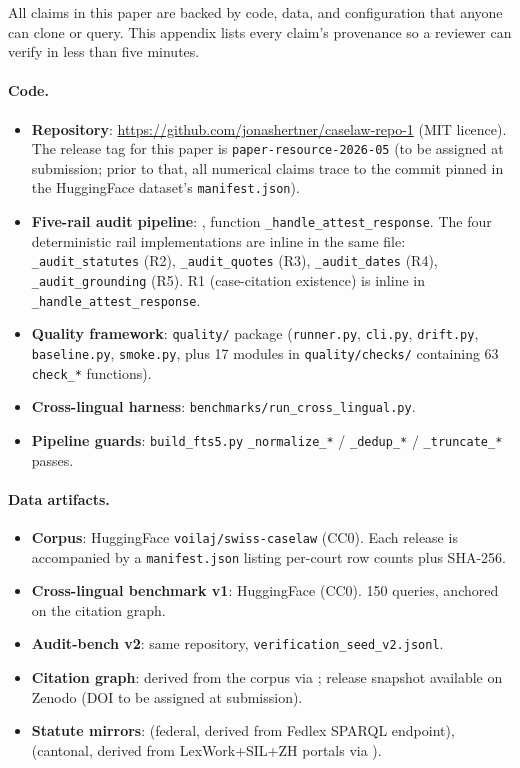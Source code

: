 All claims in this paper are backed by code, data, and configuration
that anyone can clone or query. This appendix lists every claim's
provenance so a reviewer can verify in less than five minutes.

\paragraph{Code.}
\begin{itemize}
\item \textbf{Repository}: \url{https://github.com/jonashertner/caselaw-repo-1}
  (MIT licence). The release tag for this paper is
  \texttt{paper-resource-2026-05} (to be assigned at submission;
  prior to that, all numerical claims trace to the commit pinned in
  the HuggingFace dataset's \texttt{manifest.json}).
\item \textbf{Five-rail audit pipeline}:
  , function \texttt{\_handle\_attest\_response}.
  The four
  deterministic rail implementations are inline in the same file:
  \texttt{\_audit\_statutes} (R2),
  \texttt{\_audit\_quotes} (R3),
  \texttt{\_audit\_dates} (R4),
  \texttt{\_audit\_grounding} (R5). R1 (case-citation existence) is
  inline in \texttt{\_handle\_attest\_response}.
\item \textbf{Quality framework}: \texttt{quality/} package
  (\texttt{runner.py}, \texttt{cli.py}, \texttt{drift.py},
  \texttt{baseline.py}, \texttt{smoke.py}, plus 17 modules
  in \texttt{quality/checks/} containing 63 \texttt{check\_*}
  functions).
\item \textbf{Cross-lingual harness}:
  \texttt{benchmarks/run\_cross\_lingual.py}.
\item \textbf{Pipeline guards}:
  \texttt{build\_fts5.py} \texttt{\_normalize\_*} /
  \texttt{\_dedup\_*} / \texttt{\_truncate\_*} passes.
\end{itemize}

\paragraph{Data artifacts.}
\begin{itemize}
\item \textbf{Corpus}: HuggingFace \texttt{voilaj/swiss-caselaw}
  (CC0). Each release is accompanied by a
  \texttt{manifest.json} listing per-court row counts plus SHA-256.
\item \textbf{Cross-lingual benchmark v1}: HuggingFace
  (CC0). 150 queries, anchored on the citation graph.
\item \textbf{Audit-bench v2}: same repository,
  \texttt{verification\_seed\_v2.jsonl}.
\item \textbf{Citation graph}: derived from the corpus via
  ; release snapshot
  available on Zenodo (DOI to be assigned at submission).
\item \textbf{Statute mirrors}: 
  (federal, derived from Fedlex SPARQL endpoint),
  (cantonal, derived from LexWork+SIL+ZH portals via
	  ).
\end{itemize}

